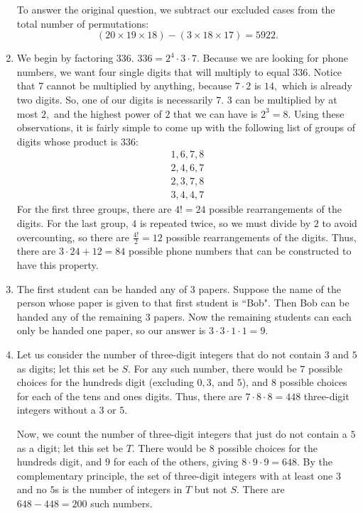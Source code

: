 \documentclass[12pt, letterpaper]{article}
\begin{document}
\begin{enumerate}
    To answer the original question, we subtract our excluded cases from the total number of permutations:
    $$(20\times19\times18) - (3\times18\times17) = \boxed{5922}.$$
    \item We begin by factoring $336$. $336 = 2^4 \cdot 3 \cdot 7.$ Because we are looking for phone numbers, we want four single digits that will multiply to equal $336.$ Notice that $7$ cannot be multiplied by anything, because $7 \cdot 2$ is $14,$ which is already two digits. So, one of our digits is necessarily $7.$ $3$ can be multiplied by at most $2,$ and the highest power of $2$ that we can have is $2^3 = 8.$ Using these observations, it is fairly simple to come up with the following list of groups of digits whose product is $336:$ 
    \begin{align*}
    1, 6, 7, 8\\
    2, 4, 6, 7\\
    2, 3, 7, 8\\
    3, 4, 4, 7
    \end{align*} 
    For the first three groups, there are $4! = 24$ possible rearrangements of the digits. For the last group, $4$ is repeated twice, so we must divide by $2$ to avoid overcounting, so there are $\frac{4!}{2} = 12$ possible rearrangements of the digits. Thus, there are $3 \cdot 24 + 12 = \boxed{84}$ possible phone numbers that can be constructed to have this property.
    \item The first student can be handed any of 3 papers. Suppose the name of the person whose paper is given to that first student is ``Bob". Then Bob can be handed any of the remaining 3 papers. Now the remaining students can each only be handed one paper, so our answer is $3\cdot 3\cdot 1\cdot 1 = \boxed{9}$.
    \item Let us consider the number of three-digit integers that do not contain $3$ and $5$ as digits; let this set be $S$. For any such number, there would be $7$ possible choices for the hundreds digit (excluding $0,3$, and $5$), and $8$ possible choices for each of the tens and ones digits. Thus, there are $7 \cdot 8 \cdot 8 = 448$ three-digit integers without a $3$ or $5$.

    Now, we count the number of three-digit integers that just do not contain a $5$ as a digit; let this set be $T$. There would be $8$ possible choices for the hundreds digit, and $9$ for each of the others, giving $8 \cdot 9 \cdot 9 = 648$. By the complementary principle, the set of three-digit integers with at least one $3$ and no $5$s is the number of integers in $T$ but not $S$. There are $648 - 448 = \boxed{200}$ such numbers.
\end{enumerate}
\end{document}

